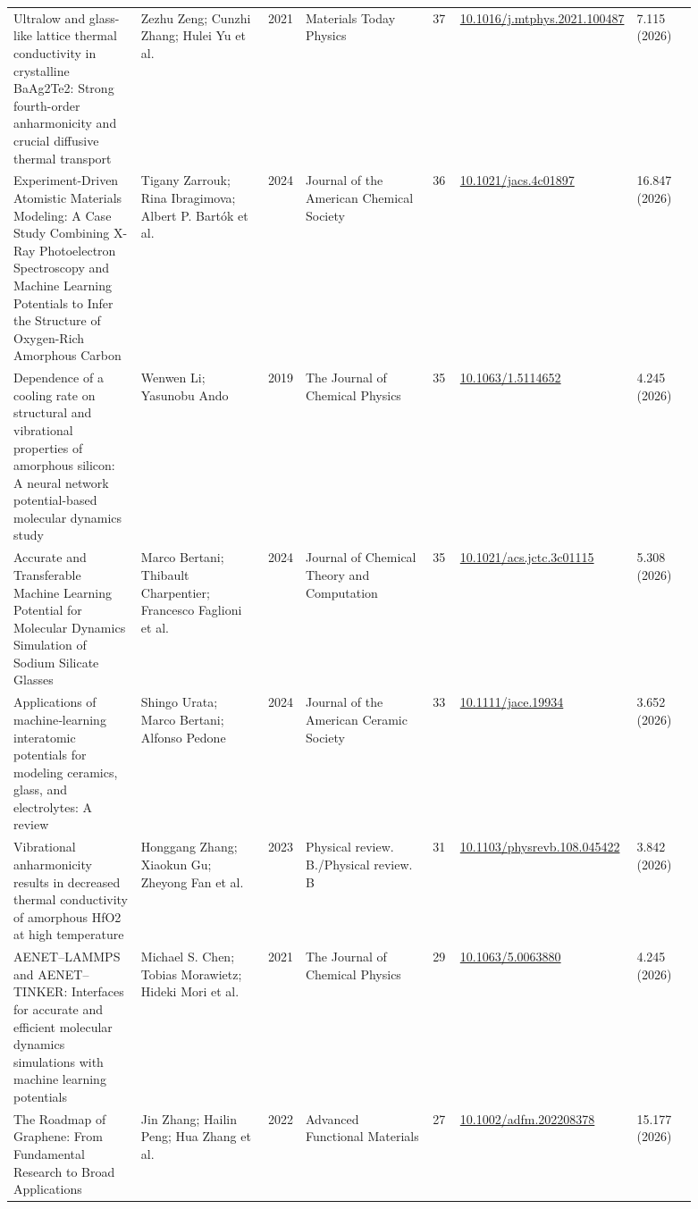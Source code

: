 \documentclass[10pt,a4paper]{article}
\begin{document}
{\begin{longtable}{p{0.192\linewidth}p{0.192\linewidth}p{0.043\linewidth}p{0.192\linewidth}p{0.043\linewidth}p{0.132\linewidth}p{0.096\linewidth}}
Ultralow and glass-like lattice thermal conductivity in crystalline BaAg2Te2: Strong fourth-order anharmonicity and crucial diffusive thermal transport & Zezhu Zeng; Cunzhi Zhang; Hulei Yu et al. & 2021 & Materials Today Physics & 37 & \href{https://doi.org/10.1016/j.mtphys.2021.100487}{10.1016/j.mtphys.2021.100487} & 7.115 (2026) \\
Experiment-Driven Atomistic Materials Modeling: A Case Study Combining X-Ray Photoelectron Spectroscopy and Machine Learning Potentials to Infer the Structure of Oxygen-Rich Amorphous Carbon & Tigany Zarrouk; Rina Ibragimova; Albert P. Bartók et al. & 2024 & Journal of the American Chemical Society & 36 & \href{https://doi.org/10.1021/jacs.4c01897}{10.1021/jacs.4c01897} & 16.847 (2026) \\
Dependence of a cooling rate on structural and vibrational properties of amorphous silicon: A neural network potential-based molecular dynamics study & Wenwen Li; Yasunobu Ando & 2019 & The Journal of Chemical Physics & 35 & \href{https://doi.org/10.1063/1.5114652}{10.1063/1.5114652} & 4.245 (2026) \\
Accurate and Transferable Machine Learning Potential for Molecular Dynamics Simulation of Sodium Silicate Glasses & Marco Bertani; Thibault Charpentier; Francesco Faglioni et al. & 2024 & Journal of Chemical Theory and Computation & 35 & \href{https://doi.org/10.1021/acs.jctc.3c01115}{10.1021/acs.jctc.3c01115} & 5.308 (2026) \\
Applications of machine‐learning interatomic potentials for modeling ceramics, glass, and electrolytes: A review & Shingo Urata; Marco Bertani; Alfonso Pedone & 2024 & Journal of the American Ceramic Society & 33 & \href{https://doi.org/10.1111/jace.19934}{10.1111/jace.19934} & 3.652 (2026) \\
Vibrational anharmonicity results in decreased thermal conductivity of amorphous HfO2 at high temperature & Honggang Zhang; Xiaokun Gu; Zheyong Fan et al. & 2023 & Physical review. B./Physical review. B & 31 & \href{https://doi.org/10.1103/physrevb.108.045422}{10.1103/physrevb.108.045422} & 3.842 (2026) \\
AENET–LAMMPS and AENET–TINKER: Interfaces for accurate and efficient molecular dynamics simulations with machine learning potentials & Michael S. Chen; Tobias Morawietz; Hideki Mori et al. & 2021 & The Journal of Chemical Physics & 29 & \href{https://doi.org/10.1063/5.0063880}{10.1063/5.0063880} & 4.245 (2026) \\
The Roadmap of Graphene: From Fundamental Research to Broad Applications & Jin Zhang; Hailin Peng; Hua Zhang et al. & 2022 & Advanced Functional Materials & 27 & \href{https://doi.org/10.1002/adfm.202208378}{10.1002/adfm.202208378} & 15.177 (2026) \\

\end{longtable}}
\end{document}

